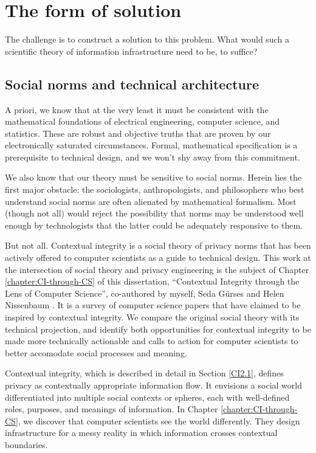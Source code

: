 \documentclass[../thesis.tex]{subfiles}
\begin{document}
 \section{The form of solution}

 The challenge is to construct a solution to this problem.
 What would such a scientific theory of information
 infrastructure need to be, to suffice?

 \subsection{Social norms and technical architecture}

 A priori, we know that at the very least it must be
 consistent with the mathematical foundations of
 electrical engineering, computer science, and statistics.
 These are robust and objective truths that are proven
 by our electronically saturated circumstances.
 Formal, mathematical specification is a prerequisite
 to technical design, and we won't shy away from this
 commitment.

 We also know that our theory must be sensitive to social
 norms.
 Herein lies the first major obstacle: the
 sociologists, anthropologists, and philosophers who best
 understand social norms are often alienated by
 mathematical formalism.
 Most (though not all) would reject the possibility that
 norms may be understood well enough by technologists
 that the latter could be adequately responsive to them.

 But not all.
 Contextual integrity is a social theory of privacy norms
 that has been actively offered to computer scientists
 as a guide to technical design.
 This work at the intersection of social theory and
 privacy engineering is the subject of 
 Chapter \ref{chapter:CI-through-CS} of this
 dissertation, ``Contextual Integrity through the Lens of Computer Science'', co-authored by myself, Seda G{\"u}rses and Helen Nissenbaum \cite{benthall2017contextual}.
 It is a survey of computer science papers that have claimed
 to be inspired by contextual integrity.
 We compare the original social theory with its technical projection, and identify both opportunities for contextual integrity to be made more technically actionable and calls to action for computer scientists to better accomodate social processes and meaning.

 Contextual integrity, which is described in detail in
 Section \ref{CI2.1}, defines privacy as contextually
 appropriate information flow.
 It envisions a social world differentiated into multiple
 social contexts or spheres, each with well-defined
 roles, purposes, and meanings of information.
 In Chapter \ref{chapter:CI-through-CS}, we discover that
 computer scientists see the world differently.
 They design infrastructure for a messy reality in which
 information crosses contextual boundaries.
\end{document}
